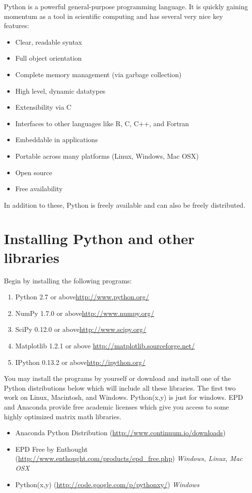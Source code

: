 \label{lab:Essential_Python}

Python is a powerful general-purpose programming language. 
It is quickly gaining momentum as a tool in scientific computing and has several very nice key features:
\begin{itemize}
\item Clear, readable syntax
\item Full object orientation
\item Complete memory management (via garbage collection)
\item High level, dynamic datatypes
\item Extensibility via C
\item Interfaces to other languages like R, C, C++, and Fortran
\item Embeddable in applications
\item Portable across many platforms (Linux, Windows, Mac OSX)
\item Open source
\item Free availability
\end{itemize}
In addition to these, Python is freely available and can also be freely distributed. 

\section*{Installing Python and other libraries}
Begin by installing the following programs:
\begin{enumerate}
\item Python 2.7 or above\url{http://www.python.org/}
\item NumPy 1.7.0 or above\url{http://www.numpy.org/}
\item SciPy 0.12.0 or above\url{http://www.scipy.org/}
\item Matplotlib 1.2.1 or above \url{http://matplotlib.sourceforge.net/}
\item IPython 0.13.2 or above\url{http://ipython.org/}
\end{enumerate}
You may install the programs by yourself or download and install one of the Python distributions below which will include all these libraries.
The first two work on Linux, Macintosh, and Windows.
Python(x,y) is just for windows.
EPD and Anaconda provide free academic licenses which give you access to some highly optimized matrix math libraries.
\begin{itemize}
\item Anaconda Python Distribution (\url{http://www.continuum.io/downloads})
\item EPD Free by Enthought (\url{http://www.enthought.com/products/epd_free.php}) \emph{Windows, Linux, Mac OSX}
\item Python(x,y) (\url{http://code.google.com/p/pythonxy/}) \emph{Windows}
\end{itemize}

